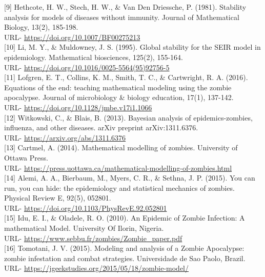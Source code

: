 [9] Hethcote, H. W., Stech, H. W., \& Van Den Driessche, P. (1981). Stability analysis for models of diseases without immunity. Journal of Mathematical Biology, 13(2), 185-198. \\
URL- \url{https://doi.org/10.1007/BF00275213} \\

[10] Li, M. Y., \& Muldowney, J. S. (1995). Global stability for the SEIR model in epidemiology. Mathematical biosciences, 125(2), 155-164. \\
URL- \url{https://doi.org/10.1016/0025-5564(95)92756-5} \\

[11] Lofgren, E. T., Collins, K. M., Smith, T. C., \& Cartwright, R. A. (2016). Equations of the end: teaching mathematical modeling using the zombie apocalypse. Journal of microbiology \& biology education, 17(1), 137-142. \\
URL- \url{https://doi.org/10.1128/jmbe.v17i1.1066} \\

[12] Witkowski, C., \& Blais, B. (2013). Bayesian analysis of epidemics-zombies, influenza, and other diseases. arXiv preprint arXiv:1311.6376. \\
URL- \url{https://arxiv.org/abs/1311.6376} \\

[13] Cartmel, A. (2014). Mathematical modelling of zombies. University of Ottawa Press. \\
URL- \url{https://press.uottawa.ca/mathematical-modelling-of-zombies.html} \\

[14] Alemi, A. A., Bierbaum, M., Myers, C. R., \& Sethna, J. P. (2015). You can run, you can hide: the epidemiology and statistical mechanics of zombies. Physical Review E, 92(5), 052801. \\
URL- \url{https://doi.org/10.1103/PhysRevE.92.052801} \\

[15] Idu, E. I., \& Oladele, R. O. (2010). An Epidemic of Zombie Infection: A mathematical Model. University Of Ilorin, Nigeria. \\
URL- \url{https://www.sebbu.fr/zombies/Zombie_paper.pdf} \\

[16] Tomotani, J. V. (2015). Modeling and analysis of a Zombie Apocalypse: zombie infestation and combat strategies. Universidade de Sao Paolo, Brazil. \\
URL- \url{https://jgeekstudies.org/2015/05/18/zombie-model/} \\

